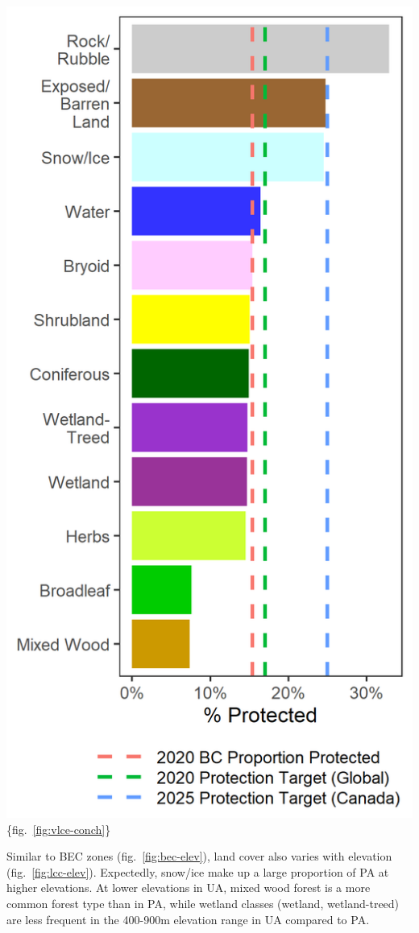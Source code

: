 \documentclass[11pt]{article}
\makeatletter
\def\maxwidth{\ifdim\Gin@nat@width>\linewidth\linewidth
\else\Gin@nat@width\fi}
\let\Oldincludegraphics\includegraphics
\renewcommand{\includegraphics}[1]{\Oldincludegraphics[width=\maxwidth]{#1}}
\makeatother
\begin{document}
\includegraphics{figures/vlce_bar.png}\{fig.~\ref{fig:vlce-conch}\}

Similar to BEC zones (fig.~\ref{fig:bec-elev}), land cover also varies
with elevation (fig.~\ref{fig:lcc-elev}). Expectedly, snow/ice make up a
large proportion of PA at higher elevations. At lower elevations in UA,
mixed wood forest is a more common forest type than in PA, while wetland
classes (wetland, wetland-treed) are less frequent in the 400-900m
elevation range in UA compared to PA.
\end{document}
